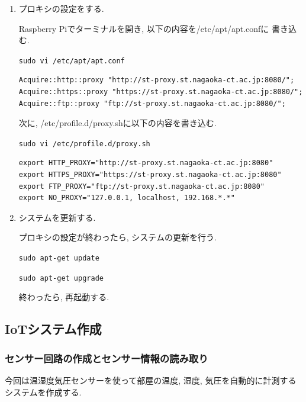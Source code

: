 \documentclass[titlepage]{jsarticle}
\begin{document}
            \begin{enumerate}
                \item プロキシの設定をする.
                
                    Raspberry Piでターミナルを開き, 以下の内容を/etc/apt/apt.confに
                    書き込む.

                    \verb|sudo vi /etc/apt/apt.conf|

                    \begin{lstlisting}[caption=apt.conf]
Acquire::http::proxy "http://st-proxy.st.nagaoka-ct.ac.jp:8080/";
Acquire::https::proxy "https://st-proxy.st.nagaoka-ct.ac.jp:8080/";
Acquire::ftp::proxy "ftp://st-proxy.st.nagaoka-ct.ac.jp:8080/";
                    \end{lstlisting}
                    
                    次に, /etc/profile.d/proxy.shに以下の内容を書き込む.

                    \verb|sudo vi /etc/profile.d/proxy.sh|

                    \begin{lstlisting}[caption=proxy.sh]
export HTTP_PROXY="http://st-proxy.st.nagaoka-ct.ac.jp:8080"
export HTTPS_PROXY="https://st-proxy.st.nagaoka-ct.ac.jp:8080"
export FTP_PROXY="ftp://st-proxy.st.nagaoka-ct.ac.jp:8080"
export NO_PROXY="127.0.0.1, localhost, 192.168.*.*"
                    \end{lstlisting}

                \item システムを更新する.
                    
                    プロキシの設定が終わったら, システムの更新を行う.

                    \verb|sudo apt-get update|

                    \verb|sudo apt-get upgrade|

                    終わったら, 再起動する.
            \end{enumerate}

    \subsection{IoTシステム作成}
        \subsubsection{センサー回路の作成とセンサー情報の読み取り} \label{sensor}
            今回は温湿度気圧センサーを使って部屋の温度, 湿度, 気圧を自動的に計測するシステムを作成する.
\end{document}
